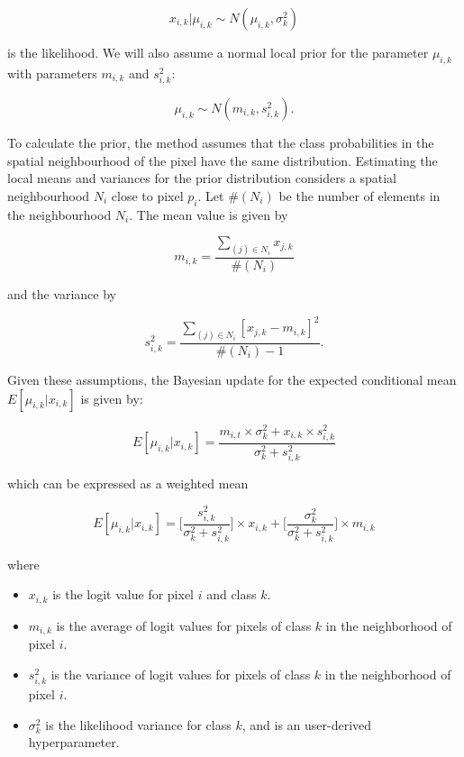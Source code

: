 \documentclass[
  shortnames]{jss}
\begin{document}
\begin{equation}
x_{i,k} | \mu_{i,k} \sim N(\mu_{i,k}, \sigma^2_{k})
\end{equation}

is the likelihood. We will also assume a normal local prior for the
parameter \(\mu_{i,k}\) with parameters \(m_{i,k}\) and \(s^2_{i,k}\):

\begin{equation}
    \mu_{i,k} \sim N(m_{i,k}, s^2_{i,k}).
\end{equation}

To calculate the prior, the method assumes that the class probabilities in the spatial
neighbourhood of the pixel have the same distribution. Estimating the local means and variances
for the prior distribution considers a spatial neighbourhood \(N_{i}\) close to pixel \(p_i\).
Let \(\#(N_{i})\) be the number of elements in the neighbourhood \(N_{i}\).
The mean value is given by

\begin{equation}
m_{i,k} = \frac{\sum_{(j) \in N_{i}} x_{j,k}}{\#(N_{i})}
\end{equation}

and the variance by

\begin{equation}
s^2_{i,k} = \frac{\sum_{(j) \in N_{i}} [x_{j,k} - m_{i,k}]^2}{\#(N_{i})-1}.
\end{equation}

Given these assumptions, the Bayesian update for the expected conditional mean
\({E}[\mu_{i,k} | x_{i,k}]\) is given by:

\begin{equation}
{E}[\mu_{i,k} | x_{i,k}] = \frac{m_{i,t} \times \sigma^2_{k} +
x_{i,k} \times s^2_{i,k}}{ \sigma^2_{k} +s^2_{i,k}}
\end{equation}

which can be expressed as a weighted mean

\begin{equation}
{E}[\mu_{i,k} | x_{i,k}] =
\Biggl [ \frac{s^2_{i,k}}{\sigma^2_{k} +s^2_{i,k}} \Biggr ] \times
x_{i,k} +
\Biggl [ \frac{\sigma^2_{k}}{\sigma^2_{k} +s^2_{i,k}} \Biggr ] \times m_{i,k}
\end{equation}

where

\begin{itemize}
\item $x_{i,k}$ is the logit value for pixel $i$ and class $k$.
\item $m_{i,k}$ is the average of logit values for pixels of class $k$ 
in the neighborhood of pixel $i$.
\item $s^2_{i,k}$ is the variance of logit values for pixels of class $k$ 
in the neighborhood of pixel $i$.
\item $\sigma^2_{k}$ is the likelihood variance for class $k$, 
and is an user-derived hyperparameter.
\end{itemize}
\end{document}
